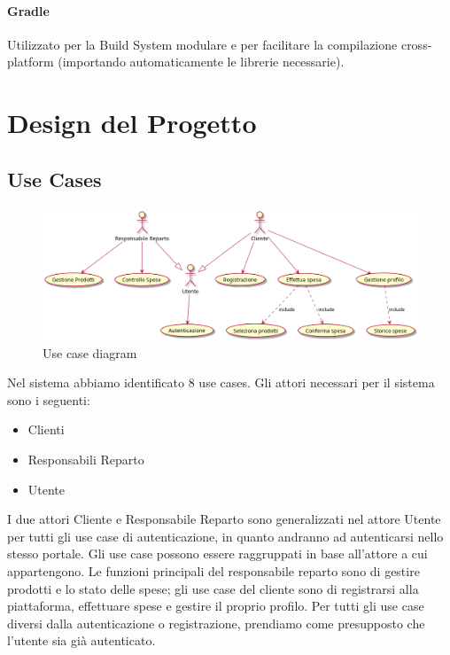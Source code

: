 \documentclass[12pt, a4paper]{report}
\begin{document}
\subsubsection{Gradle}
Utilizzato per la Build System modulare e per facilitare la compilazione cross-platform (importando automaticamente le librerie necessarie).

\chapter{Design del Progetto}

\section{Use Cases}

\begin{figure}[h]
  \centering
  \includegraphics[width=\textwidth]{use_case_diagram.png}
  \caption{Use case diagram}
\end{figure}

Nel sistema abbiamo identificato 8 use cases. Gli attori necessari per il 
sistema sono i seguenti:

\begin{itemize}
  \item Clienti
  \item Responsabili Reparto
  \item Utente
\end{itemize}

I due attori Cliente e Responsabile Reparto sono generalizzati nel attore Utente
per tutti gli use case di autenticazione, in quanto andranno ad autenticarsi
nello stesso portale.  Gli use case possono essere raggruppati in base 
all'attore a cui appartengono. Le funzioni principali del responsabile reparto 
sono di gestire prodotti e lo stato delle spese; gli use case del cliente sono
di registrarsi alla piattaforma, effettuare spese e gestire il proprio profilo.
Per tutti gli use case diversi dalla autenticazione o registrazione, prendiamo
come presupposto che l'utente sia già autenticato.
\end{document}
